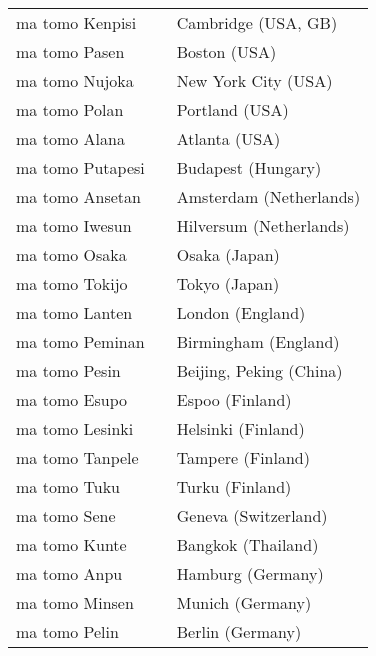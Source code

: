 \begin{supertabular}{p{4,5cm}|ll}
ma tomo Kenpisi && Cambridge (USA, GB) \\
ma tomo Pasen && Boston (USA) \\
ma tomo Nujoka && New York City (USA) \\
ma tomo Polan && Portland (USA) \\
ma tomo Alana && Atlanta (USA) \\
ma tomo Putapesi && Budapest (Hungary) \\
ma tomo Ansetan && Amsterdam (Netherlands) \\
ma tomo Iwesun && Hilversum (Netherlands) \\ 
ma tomo Osaka && Osaka (Japan) \\ 
ma tomo Tokijo && Tokyo (Japan) \\ 
ma tomo Lanten && London (England) \\ 
ma tomo Peminan && Birmingham (England) \\ 
ma tomo Pesin && Beijing, Peking (China) \\
ma tomo Esupo && Espoo (Finland) \\
ma tomo Lesinki && Helsinki (Finland) \\
ma tomo Tanpele && Tampere (Finland) \\
ma tomo Tuku && Turku (Finland) \\
ma tomo Sene && Geneva (Switzerland) \\
ma tomo Kunte && Bangkok (Thailand) \\
ma tomo Anpu && Hamburg (Germany) \\
ma tomo Minsen && Munich (Germany) \\
ma tomo Pelin && Berlin (Germany) \\
\end{supertabular} \\
%
%
%
